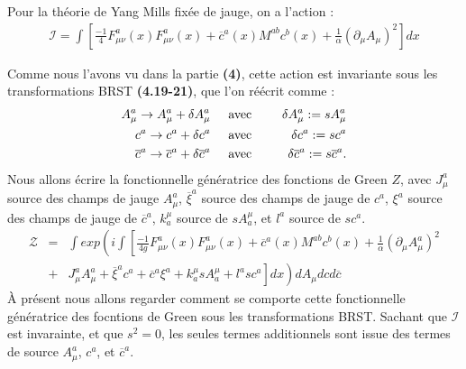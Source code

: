 \documentclass[a4paper,11pt]{article}
\theoremstyle{plain}
\theoremstyle{definition}
\theoremstyle{remark}
\numberwithin{equation}{section}
\numberwithin{equation}{subsection}
\numberwithin{figure}{section}
\begin{document}
\noindent
Pour la théorie de Yang Mills fixée de jauge, on a l'action :
\begin{eqnarray}
 \mathcal{I} =  \int \left[ 
\frac{-1}{4} F^{a}_{\mu\nu}(x)F^{a}_{\mu \nu}(x) + \overline{c}^{a}(x)M^{ab}c^{b}(x) + \frac{1}{\alpha} (\partial_{\mu}A_{\mu})^2  
\right] dx 
\end{eqnarray}

\noindent
Comme nous l'avons vu dans la partie \textbf{(4)}, cette action est invariante sous les transformations BRST \textbf{(4.19-21)}, 
que l'on réécrit comme :
\begin{eqnarray}
 A_{\mu}^{a} \rightarrow  A_{\mu}^{a} + \delta  A_{\mu}^{a}   \hspace{5mm}  &\text{avec}&   \hspace{5mm}  \delta  A_{\mu}^{a} := s  A_{\mu}^{a} \\
 c^{a}  \rightarrow  c^{a}  + \delta  c^{a}   \hspace{5mm}  &\text{avec}&   \hspace{5mm}    \delta  c^{a} := s  c^{a}  \\
 \overline{c}^{a}  \rightarrow  \overline{c}^{a}  + \delta  \overline{c}^{a}   \hspace{5mm}  &\text{avec}&   \hspace{5mm} 
\delta  \overline{c}^{a} := s  \overline{c}^{a}  .
\end{eqnarray}
Nous allons écrire la fonctionnelle génératrice des fonctions de Green $Z$, avec $ J_{\mu}^{a}$ source des champs de jauge $A_{\mu}^{a}$, 
$\overline{\xi}^{a}$ source des champs de jauge de $c^{a}$,  $\xi^{a}$ source des champs de jauge de $\overline{c}^{a}$, $k^{\mu}_{a}$ source 
de $sA^{\mu}_{a}$, et $l^{a}$ source de $sc^{a}$.
\begin{eqnarray}
 \mathcal{Z} &=& \int exp\left( i \int \left[
\frac{-1}{4g} F^{a}_{\mu\nu}(x)F^{a}_{\mu \nu}(x) + \overline{c}^{a}(x)M^{ab}c^{b}(x) 
+ \frac{1}{\alpha}(\partial_{\mu}A_{\mu}^{a})^2 \right. \right. \nonumber \\
     &+& \left. \left. J_{\mu}^{a}A_{\mu}^{a} + \overline{\xi}^{a}c^{a} + \overline{c}^{a}\xi^{a} + k^{\mu}_{a}sA^{\mu}_{a} 
+ l^{a}sc^{a} \right] dx \right) dA_{\mu} dc d\overline{c} 
\end{eqnarray}
À présent nous allons regarder comment se comporte cette fonctionnelle génératrice des focntions de Green sous les transformations BRST. Sachant que $\mathcal{I}$ est invarainte, et que $s^2=0$, les seules termes additionnels sont issue des termes de source $A_{\mu}^{a}$, $c^{a}$, et $\overline{c}^{a}$.
\end{document}
